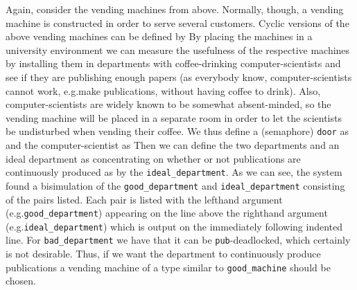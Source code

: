 Again, consider the vending machines from above. Normally, though, a vending machine is constructed in order to serve several customers. Cyclic versions of the above vending machines can be defined by
By placing  the machines in a university environment we can measure the usefulness of the respective machines by installing them in departments with coffee-drinking computer-scientists and see if they are publishing enough papers (as everybody know, computer-scientists cannot work, e.g.\@ make publications, without having coffee to drink). Also, computer-scientists are widely known to be somewhat absent-minded, so the vending machine will be placed in a separate room in order to let the scientists be undisturbed when vending their coffee. We thus define a (semaphore) \verb!door! as
%
and the computer-scientist as
%
Then we can define the two departments and an ideal department as
%
concentrating on whether or not publications are continuously produced as by the \verb!ideal_department!.
%
As we can see, the system found a bisimulation of the \verb!good_department! and \verb!ideal_department! consisting of the pairs listed. Each pair is listed with the lefthand argument (e.g.\@ \verb!good_department!) appearing on the line above the righthand argument (e.g.\@ \verb!ideal_department!) which is output on the immediately following indented line. For \verb!bad_department! we have
%
that it can be \verb!pub!-deadlocked, which certainly is not desirable. Thus, if we want the department to continuously produce publications a vending machine of a type similar to \verb!good_machine! should be chosen.
